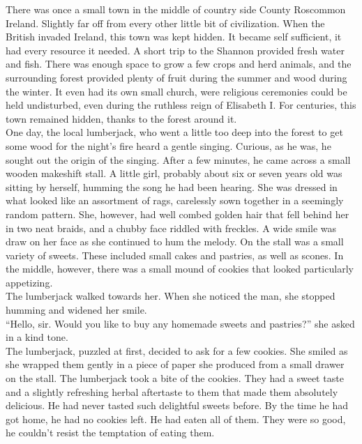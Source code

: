 \documentclass[a4paper,onecolumn,11pt]{article}
\begin{document}
There was once a small town in the middle of country side County Roscommon Ireland. Slightly far off from every other little bit of civilization. When the British invaded Ireland, this town was kept hidden. It became self sufficient, it had every resource it needed. A short trip to the Shannon provided fresh water and fish. There was enough space to grow a few crops and herd animals, and the surrounding forest provided plenty of fruit during the summer and wood during the winter. It even had its own small church, were religious ceremonies could be held undisturbed, even during the ruthless reign of Elisabeth I. For centuries, this town remained hidden, thanks to the forest around it.\\
\newline
One day, the local lumberjack, who went a little too deep into the forest to get some wood for the night's fire heard a gentle singing. Curious, as he was, he sought out the origin of the singing. After a few minutes, he came across a small wooden makeshift stall. A little girl, probably about six or seven years old was sitting by herself, humming the song he had been hearing. She was dressed in what looked like an assortment of rags, carelessly sown together in a seemingly random pattern. She, however, had well combed golden hair that fell behind her in two neat braids, and a chubby face riddled with freckles. A wide smile was draw on her face as she continued to hum the melody. On the stall was a small variety of sweets. These included small cakes and pastries, as well as scones. In the middle, however, there was a small mound of cookies that looked particularly appetizing.\\
\newline
The lumberjack walked towards her. When she noticed the man, she stopped humming and widened her smile.\\
\newline
``Hello, sir. Would you like to buy any homemade sweets and pastries?'' she asked in a kind tone.\\
\newline
The lumberjack, puzzled at first, decided to ask for a few cookies. She smiled as she wrapped them gently in a piece of paper she produced from a small drawer on the stall. The lumberjack took a bite of the cookies. They had a sweet taste and a slightly refreshing herbal aftertaste to them that made them absolutely delicious. He had never tasted such delightful sweets before. By the time he had got home, he had no cookies left. He had eaten all of them. They were so good, he couldn't resist the temptation of eating them.\\
\end{document}
